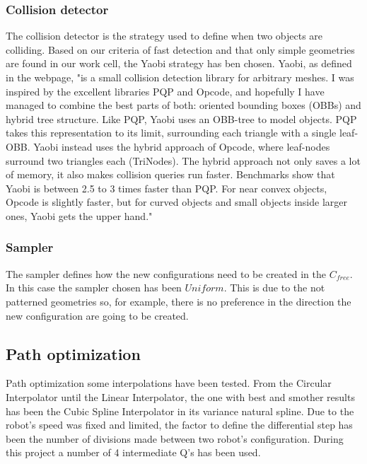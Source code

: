 	\subsubsection{Collision detector} %
	\label{sub:collision_detector}
	The collision detector is the strategy used to define when two objects are colliding. Based on our criteria of fast detection and that only simple geometries are found in our work cell, the Yaobi strategy \cite{Yaobi} has ben chosen. Yaobi, as defined in the webpage,  "is a small collision detection library for arbitrary meshes. I was inspired by the excellent libraries PQP and Opcode, and hopefully I have managed to combine the best parts of both: oriented bounding boxes (OBBs) and hybrid tree structure. Like PQP, Yaobi uses an OBB-tree to model objects. PQP takes this representation to its limit, surrounding each triangle with a single leaf-OBB. Yaobi instead uses the hybrid approach of Opcode, where leaf-nodes surround two triangles each (TriNodes). The hybrid approach not only saves a lot of memory, it also makes collision queries run faster. Benchmarks show that Yaobi is between 2.5 to 3 times faster than PQP. For near convex objects, Opcode is slightly faster, but for curved objects and small objects inside larger ones, Yaobi gets the upper hand."
	\subsubsection{Sampler} %
	\label{sub:sampler}
	The sampler defines how the new configurations need to be created in the $C_{free}$. In this case the sampler chosen has been $Uniform$. This is due to the not patterned geometries so, for example, there is no preference in the direction the new configuration are going to be created.
\subsection{Path optimization} %
\label{sub:path_optimization_implementation}
Path optimization some interpolations have been tested. 
From the Circular Interpolator until the Linear Interpolator, the one with best and smother results has been the Cubic Spline Interpolator in its variance natural spline.
Due to the robot's speed was fixed and limited, the factor to define the differential step has been the number of divisions made between two robot's configuration. 
During this project a number of 4 intermediate Q's has been used.


